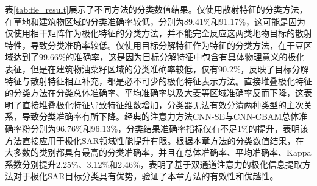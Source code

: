 表\ref{tab:fle_result}展示了不同方法的分类数值结果。仅使用散射特征的分类方法，在草地和建筑物区域的分类准确率较低，分别为89.41\%和91.17\%，这可能是因为仅使用相干矩阵作为极化特征的分类方法，并不能完全反应这两类地物目标的散射特性，导致分类准确率较低。仅使用目标分解特征作为特征的分类方法，在干豆区域达到了99.66\%的准确率，这是因为目标分解特征中包含有具体物理意义的极化表征，但是在建筑物油菜籽区域的分类准确率较低，仅有90.2\%，反映了目标分解特征与散射特征相互补充，都是必不可少的极化特征表示方法。直接堆叠极化特征的分类方法在分类总体准确率、平均准确率以及大麦等区域准确率反而下降，这表明了直接堆叠极化特征导致特征维数增加，分类器无法有效分清两种类型的主次关系，导致分类准确率有所下降。经典的注意力方法CNN-SE与CNN-CBAM总体准确率粉分别为96.76\%和96.13\%，分类结果准确率指标仅有不足1\%的提升，表明该方法直接应用于极化SAR领域性能提升有限。根据本章方法的分类数值结果，在大多数的类别都具有最高的分类准确率，并且在总体准确率、平均准确率、Kappa系数分别提升2.25\%、3.12\%和2.46\%，表明了基于双通道注意力的极化信息提取方法对于极化SAR目标分类具有优势，验证了本章方法的有效性和优越性。


